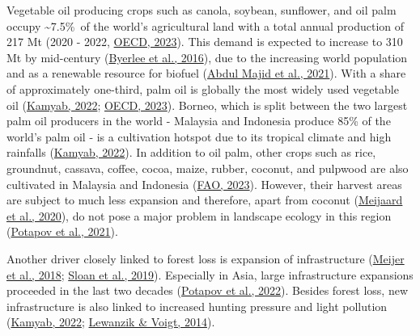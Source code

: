 \documentclass[
  letterpaper,
  DIV=11,
  numbers=noendperiod]{scrreprt}
\begin{document}
Vegetable oil producing crops such as canola, soybean, sunflower, and
oil palm occupy \textasciitilde7.5\%~of the world's agricultural land
with a total annual production of 217 Mt (2020 - 2022,
\protect\hyperlink{ref-oecdOECDFAOAgriculturalOutlook2023}{OECD, 2023}).
This demand is expected to increase to 310 Mt by mid-century
(\protect\hyperlink{ref-byerleeTropicalOilCrop2016}{Byerlee et al.,
2016}), due to the increasing world population and as a renewable
resource for biofuel
(\protect\hyperlink{ref-abdulmajidSustainablePalmOil2021}{Abdul Majid et
al., 2021}). With a share of approximately one-third, palm oil is
globally the most widely used vegetable oil
(\protect\hyperlink{ref-kamyabElaeisGuineensis2022}{Kamyab, 2022};
\protect\hyperlink{ref-oecdOECDFAOAgriculturalOutlook2023}{OECD, 2023}).
Borneo, which is split between the two largest palm oil producers in the
world - Malaysia and Indonesia produce 85\% of the world's palm oil - is
a cultivation hotspot due to its tropical climate and high rainfalls
(\protect\hyperlink{ref-kamyabElaeisGuineensis2022}{Kamyab, 2022}). In
addition to oil palm, other crops such as rice, groundnut, cassava,
coffee, cocoa, maize, rubber, coconut, and pulpwood are also cultivated
in Malaysia and Indonesia
(\protect\hyperlink{ref-faoFAOSTATDatabase2023}{FAO, 2023}). However,
their harvest areas are subject to much less expansion and therefore,
apart from coconut
(\protect\hyperlink{ref-meijaardCoconutOilConservation2020}{Meijaard et
al., 2020}), do not pose a major problem in landscape ecology in this
region (\protect\hyperlink{ref-potapovGlobalMapsCropland2021}{Potapov et
al., 2021}).

Another driver closely linked to forest loss is expansion of
infrastructure
(\protect\hyperlink{ref-meijerGlobalPatternsCurrent2018}{Meijer et al.,
2018};
\protect\hyperlink{ref-sloanHiddenChallengesConservation2019}{Sloan et
al., 2019}). Especially in Asia, large infrastructure expansions
proceeded in the last two decades
(\protect\hyperlink{ref-potapovGlobal20002020Land2022}{Potapov et al.,
2022}). Besides forest loss, new infrastructure is also linked to
increased hunting pressure and light pollution
(\protect\hyperlink{ref-kamyabElaeisGuineensis2022}{Kamyab, 2022};
\protect\hyperlink{ref-lewanzikArtificialLightPuts2014}{Lewanzik \&
Voigt, 2014}).
\end{document}
